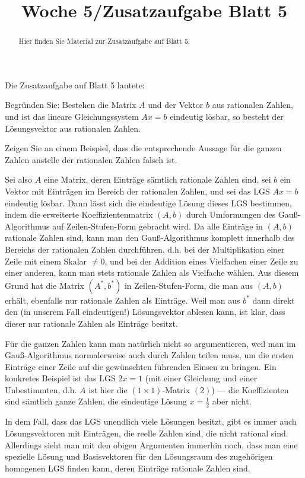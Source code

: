 \documentclass{ximera}
\title{Woche 5/Zusatzaufgabe Blatt 5}
\begin{document}
\begin{abstract}
Hier finden Sie Material zur Zusatzaufgabe auf Blatt 5.
\end{abstract}
\maketitle

Die Zusatzaufgabe auf Blatt 5 lautete:

Begründen Sie: Bestehen die Matrix $A$ und der Vektor $b$ aus rationalen Zahlen, und ist das lineare Gleichungssystem $Ax=b$ eindeutig lösbar, so besteht der Lösungsvektor aus rationalen Zahlen.

Zeigen Sie an einem Beispiel, dass die entsprechende Aussage für die ganzen Zahlen anstelle der rationalen Zahlen falsch ist.


Sei also $A$ eine Matrix, deren Einträge sämtlich rationale Zahlen sind, sei $b$ ein Vektor mit Einträgen im Bereich der rationalen Zahlen, und sei das LGS $Ax=b$ eindeutig lösbar. Dann lässt sich die eindeutige Lösung dieses LGS bestimmen, indem die erweiterte Koeffizientenmatrix $(A,b)$ durch Umformungen des Gauß-Algorithmus auf Zeilen-Stufen-Form gebracht wird. Da alle Einträge in $(A,b)$ rationale Zahlen sind, kann man den Gauß-Algorithmus komplett innerhalb des Bereichs der rationalen Zahlen durchführen, d.h. bei der Multiplikation einer Zeile mit einem Skalar $\ne 0$, und bei der Addition eines Vielfachen einer Zeile zu einer anderen, kann man stets rationale Zahlen als Vielfache wählen. Aus diesem Grund hat die Matrix $(A^*, b^*)$ in Zeilen-Stufen-Form, die man aus $(A,b)$ erhält, ebenfalls nur rationale Zahlen als Einträge. Weil man aus $b^*$ dann direkt den (in unserem Fall eindeutigen!) Lösungsvektor ablesen kann, ist klar, dass dieser nur rationale Zahlen als Einträge besitzt.

Für die ganzen Zahlen kann man natürlich nicht so argumentieren, weil man im Gauß-Algorithmus normalerweise auch durch Zahlen teilen muss, um die ersten Einträge einer Zeile auf die gewünschten führenden Einsen zu bringen. Ein konkretes Beispiel ist das LGS $2x=1$ (mit einer Gleichung und einer Unbestimmten, d.h. $A$ ist hier die $(1\times 1)$-Matrix $(2)$) --- die Koeffizienten sind sämtlich ganze Zahlen, die eindeutige Lösung $x=\frac 12$ aber nicht.

In dem Fall, dass das LGS unendlich viele Lösungen besitzt, gibt es immer auch Lösungsvektoren mit Einträgen, die reelle Zahlen sind, die nicht rational sind. Allerdings sieht man mit den obigen Argumenten immerhin noch, dass man eine spezielle Lösung und Basisvektoren für den Lösungsraum des zugehörigen homogenen LGS finden kann, deren Einträge rationale Zahlen sind.
\end{document}

